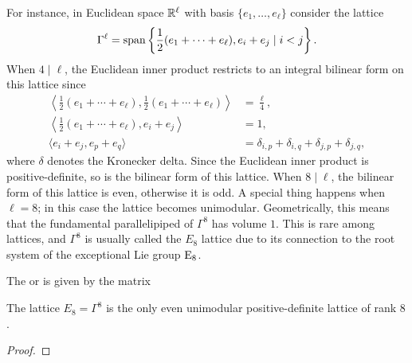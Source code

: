 For instance, in Euclidean space $\mathbb{R}^\ell$ with basis $\{e_1,\ldots, e_\ell\}$ consider the lattice
\[
	\Gamma^\ell = \operatorname{span}\left\{\frac{1}{2}(e_1+\cdots + e_\ell), e_i+e_j \mid i<j\right\}.
\]
When $4\mid \ell$, the Euclidean inner product restricts to an integral bilinear form on this lattice since
\[
	\begin{aligned}
		\left\langle \frac{1}{2}(e_1+\cdots+e_\ell), \frac{1}{2}(e_1+\cdots+e_\ell)\right\rangle & = \frac{\ell}{4},                                      \\
		\left\langle \frac{1}{2}(e_1+\cdots+e_\ell), e_i+e_j\right\rangle                        & = 1,                                                   \\
		\langle e_i+e_j, e_p +e_q\rangle                                                         & = \delta_{i,p}+\delta_{i,q}+\delta_{j,p}+\delta_{j,q},
	\end{aligned}
\]
where $\delta$ denotes the Kronecker delta. Since the Euclidean inner product is positive-definite, so is the bilinear form of this lattice. When $8\mid\ell$, the bilinear form of this lattice is even, otherwise it is odd. A special thing happens when $\ell=8$; in this case the lattice becomes unimodular. Geometrically, this means that the fundamental parallelipiped of $\Gamma^8$ has volume $1$. This is rare among lattices, and $\Gamma^8$ is usually called the ${E_8}$ lattice due to its connection to the root system of the exceptional Lie group $\mathrm{E}_8$.

\begin{definition}\label{def:E8-lattice}
	The  or  is given by the matrix
\end{definition}

\begin{theorem}[Mordell]
	The lattice $E_8=\Gamma^8$ is the only even unimodular positive-definite lattice of rank $8$.
\end{theorem}
\begin{proof}
\end{proof}

